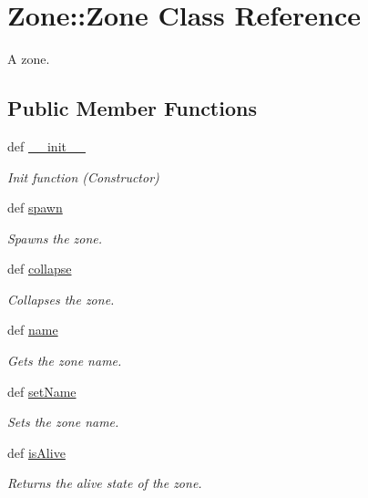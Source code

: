 \hypertarget{class_zone_1_1_zone}{
\section{\-Zone\-:\-:\-Zone \-Class \-Reference}
\label{class_zone_1_1_zone}
}


\-A zone.  


\subsection*{\-Public \-Member \-Functions}
\begin{DoxyCompactItemize}
\item 
def \hyperlink{class_zone_1_1_zone_a509dd2d846554e14d1e78176a9b12a95}{\-\_\-\-\_\-init\-\_\-\-\_\-}
\begin{DoxyCompactList}\small\item\em \-Init function (\-Constructor) \end{DoxyCompactList}\item 
def \hyperlink{class_zone_1_1_zone_a834bb888e1dd5ffe05738be44cd97892}{spawn}
\begin{DoxyCompactList}\small\item\em \-Spawns the zone. \end{DoxyCompactList}\item 
def \hyperlink{class_zone_1_1_zone_a6719cbfec154d708349fbbad22787d18}{collapse}
\begin{DoxyCompactList}\small\item\em \-Collapses the zone. \end{DoxyCompactList}\item 
def \hyperlink{class_zone_1_1_zone_ab5ec2f22a8cc5c7693c7ac0a261c694b}{name}
\begin{DoxyCompactList}\small\item\em \-Gets the zone name. \end{DoxyCompactList}\item 
def \hyperlink{class_zone_1_1_zone_aa06c8addac2b8611ae6ca0c9c0e661c4}{set\-Name}
\begin{DoxyCompactList}\small\item\em \-Sets the zone name. \end{DoxyCompactList}\item 
def \hyperlink{class_zone_1_1_zone_a2592b191a6035ff4a3148181cd2d7c9b}{is\-Alive}
\begin{DoxyCompactList}\small\item\em \-Returns the alive state of the zone. \end{DoxyCompactList}\item 

\end{DoxyCompactItemize}

